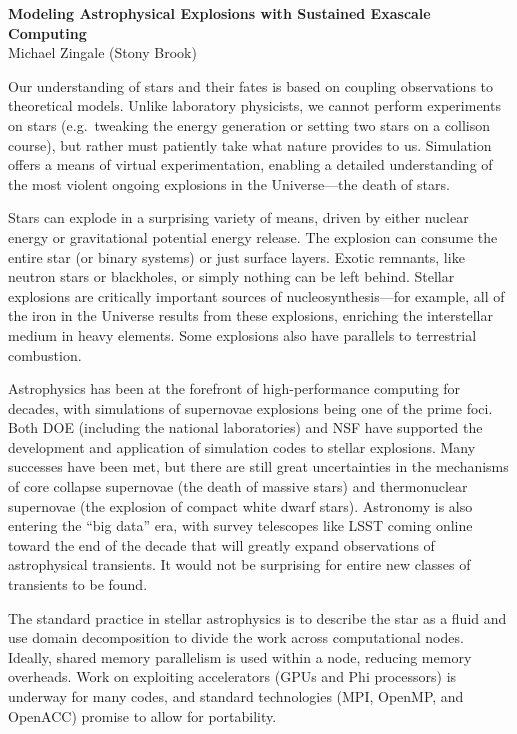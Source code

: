 \documentclass[11pt]{article}
\begin{document}
\begin{center}
{\sffamily \bfseries \large Modeling Astrophysical Explosions with Sustained Exascale Computing} \\
Michael Zingale (Stony Brook)
\end{center}

Our understanding of stars and their fates is based on coupling
observations to theoretical models.  Unlike laboratory physicists, we
cannot perform experiments on stars (e.g.\ tweaking the energy
generation or setting two stars on a collison course), but rather must
patiently take what nature provides to us.  Simulation offers a means
of virtual experimentation, enabling a detailed understanding of the
most violent ongoing explosions in the Universe---the death of stars.

Stars can explode in a surprising variety of means, driven by either
nuclear energy or gravitational potential energy release.  The
explosion can consume the entire star (or binary systems) or just
surface layers.  Exotic remnants, like neutron stars or blackholes, or
simply nothing can be left behind.  Stellar explosions are critically
important sources of nucleosynthesis---for example, all of the iron in
the Universe results from these explosions, enriching the interstellar
medium in heavy elements.  Some explosions also have parallels to
terrestrial combustion.

Astrophysics has been at the forefront of high-performance computing
for decades, with simulations of supernovae explosions being one of
the prime foci.  Both DOE (including the national laboratories) and
NSF have supported the development and application of simulation codes
to stellar explosions.  Many successes have been met, but there are
still great uncertainties in the mechanisms of core collapse
supernovae (the death of massive stars) and thermonuclear supernovae
(the explosion of compact white dwarf stars).  Astronomy is also
entering the ``big data'' era, with survey telescopes like LSST coming
online toward the end of the decade that will greatly expand
observations of astrophysical transients.  It would not be surprising
for entire new classes of transients to be found.

The standard practice in stellar astrophysics is to describe the star
as a fluid and use domain decomposition to divide the work across
computational nodes.  Ideally, shared memory parallelism is used
within a node, reducing memory overheads.  Work on exploiting
accelerators (GPUs and Phi processors) is underway for many codes, and
standard technologies (MPI, OpenMP, and OpenACC) promise to allow for
portability.
\end{document}
